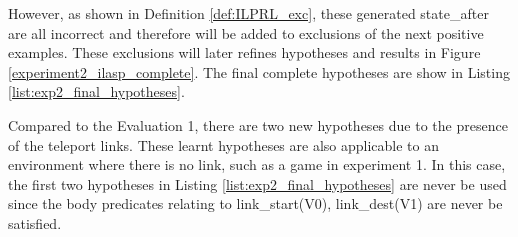 However, as shown in Definition \ref{def:ILPRL_exc}, these generated state\_after are all incorrect and therefore will be added to exclusions of the next positive examples.
These exclusions will later refines hypotheses and results in Figure \ref{experiment2_ilasp_complete}.
The final complete hypotheses are show in Listing \ref{list:exp2_final_hypotheses}.




Compared to the Evaluation 1, there are two new hypotheses due to the presence of the teleport links.
These learnt hypotheses are also applicable to an environment where there is no link, such as a game in experiment 1.
In this case, the first two hypotheses in Listing \ref{list:exp2_final_hypotheses} are never be used 
since the body predicates relating to link\_start(V0), link\_dest(V1) are never be satisfied.

